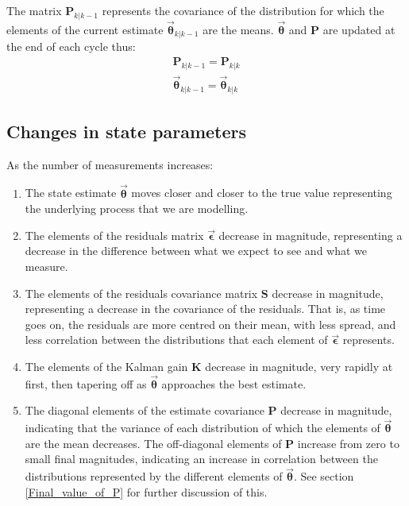 \documentclass[a4paper]{article}
\begin{document}
		\noindent The matrix $\bm{P}_{k|k-1}$ represents the covariance of the distribution for which the elements of the current estimate $\bm{\vec{\theta}}_{k|k-1}$ are the means. $\bm{\vec{\theta}}$ and $\bm{P}$ are updated at the end of each cycle thus:
		\begin{align}
			\bm{P}_{k|k-1}=\bm{P}_{k|k}\\
			\bm{\vec{\theta}}_{k|k-1}=\bm{\vec{\theta}}_{k|k}
		\end{align}
	
	
	\subsection{Changes in state parameters}
	As the number of measurements increases:
		\begin{enumerate}
			\item The state estimate $\bm{\vec{\theta}}$ moves closer and closer to the true value representing the underlying process that we are modelling.
			\item The elements of the residuals matrix $\bm{\vec{\epsilon}}$ decrease in magnitude, representing a decrease in the difference between what we expect to see and what we measure.
			\item The elements of the residuals covariance matrix $\bm{S}$ decrease in magnitude, representing a decrease in the covariance of the residuals. That is, as time goes on, the residuals are more centred on their mean, with less spread, and less correlation between the distributions that each element of $\bm{\vec{\epsilon}}$ represents.
			\item The elements of the Kalman gain $\bm{K}$ decrease in magnitude, very rapidly at first, then tapering off as $\bm{\vec{\theta}}$ approaches the best estimate.
			\item The diagonal elements of the estimate covariance $\bm{P}$ decrease in magnitude, indicating that the variance of each distribution of which the elements of $\bm{\vec{\theta}}$ are the mean decreases. The off-diagonal elements of $\bm{P}$ increase from zero to small final magnitudes, indicating an increase in correlation between the distributions represented by the different elements of $\bm{\vec{\theta}}$. See section \ref{Final_value_of_P} for further discussion of this.
		\end{enumerate}
	
\end{document}
